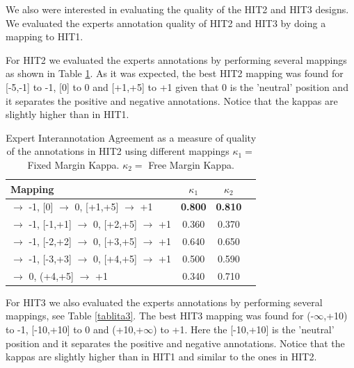 \documentclass[11pt, a4paper,onecolumn]{article}
\begin{document}

We also were interested in evaluating the quality of the
HIT2 and HIT3 designs. We evaluated the experts annotation quality of HIT2 and HIT3 by doing a mapping to HIT1.  

For HIT2 we evaluated the experts annotations by performing several mappings as shown in Table \ref{tablita2}.
As it was expected, the best HIT2 mapping was found for [-5,-1] to -1, [0] to 0 and [+1,+5] to +1 given that 0 is the 'neutral' position and it separates the positive and negative annotations. Notice that the kappas are
slightly higher than in HIT1.

\begin{table}[h]
\begin{center}
\begin{tabular}{|l|c|c|c|}
\hline
Mapping & $\kappa_{1}$ & $\kappa_{2}$ \\ 
\hline
[-5,-1] $\rightarrow$ -1, [0] $\rightarrow$ 0, [+1,+5] $\rightarrow$ +1& \textbf{0.800} & \textbf{0.810}\\ \hline
[-5,-2] $\rightarrow$ -1, [-1,+1] $\rightarrow$ 0, [+2,+5] $\rightarrow$ +1& 0.360 & 0.370\\ \hline
[-5,-3] $\rightarrow$ -1, [-2,+2] $\rightarrow$ 0, [+3,+5] $\rightarrow$ +1& 0.640 & 0.650\\ \hline
[-5,-4] $\rightarrow$ -1, [-3,+3] $\rightarrow$ 0, [+4,+5] $\rightarrow$ +1& 0.500 & 0.590\\ \hline
[-5,-4) $\rightarrow$ -1, [-4,+4] $\rightarrow$ 0, (+4,+5] $\rightarrow$ +1& 0.340 & 0.710\\ \hline
\end{tabular}
\end{center}
\caption{Expert Interannotation Agreement as a measure of quality of the annotations in HIT2 using different mappings $\kappa_{1} = $ Fixed Margin Kappa. $\kappa_{2} = $ Free Margin Kappa.}
\label{tablita2}
\end{table}


For HIT3 we also evaluated the experts annotations by performing several mappings, see Table \ref{tablita3}.
The best HIT3 mapping was found for (-$\infty$,+10) to -1, [-10,+10] to 0 and (+10,+$\infty$) to +1. Here the [-10,+10] is the 'neutral' position and it separates the positive and negative annotations. Notice that the kappas are slightly higher than in HIT1 and similar to the ones in HIT2.
\end{document}
